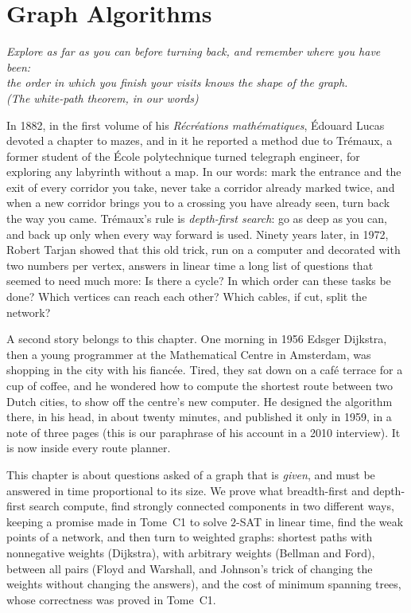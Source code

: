 \chapter{Graph Algorithms}\label{ch:graphs}

\begin{center}\itshape
Explore as far as you can before turning back, and remember where you have been:\\
the order in which you finish your visits knows the shape of the graph.\\
\upshape(The white-path theorem, in our words)
\end{center}

In 1882, in the first volume of his \emph{R\'ecr\'eations math\'ematiques}, \'Edouard Lucas devoted a chapter to mazes, and in it he reported a method
due to Tr\'emaux, a former student of the \'Ecole polytechnique turned telegraph engineer, for exploring any labyrinth without a map. In our words: mark the
entrance and the exit of every corridor you take, never take a corridor already marked twice, and when a new corridor brings you to a crossing you have already seen,
turn back the way you came. Tr\'emaux's rule is \emph{depth-first search}: go as deep as you can, and back up only when every way forward is used. Ninety years
later, in 1972, Robert Tarjan showed that this old trick, run on a computer and decorated with two numbers per vertex, answers in linear time a long list
of questions that seemed to need much more: Is there a cycle? In which order can these tasks be done? Which vertices can reach each other? Which
cables, if cut, split the network?

A second story belongs to this chapter. One morning in 1956 Edsger Dijkstra, then a young programmer at the Mathematical Centre in Amsterdam, was
shopping in the city with his fiancée. Tired, they sat down on a caf\'e terrace for a cup of coffee, and he wondered how to compute the shortest route
between two Dutch cities, to show off the centre's new computer. He designed the algorithm there, in his head, in about twenty minutes, and published it only
in 1959, in a note of three pages (this is our paraphrase of his account in a 2010 interview). It is now inside every route planner.

This chapter is about questions asked of a graph that is \emph{given}, and must be answered in time proportional to its size. We prove what breadth-first
and depth-first search compute, find strongly connected components in two different ways, keeping a promise made in Tome~C1 to solve $2$-SAT in linear time,
find the weak points of a network, and then turn to weighted graphs: shortest paths with nonnegative weights (Dijkstra), with arbitrary weights (Bellman and Ford),
between all pairs (Floyd and Warshall, and Johnson's trick of changing the weights without changing the answers), and the cost of minimum spanning trees,
whose correctness was proved in Tome~C1.

